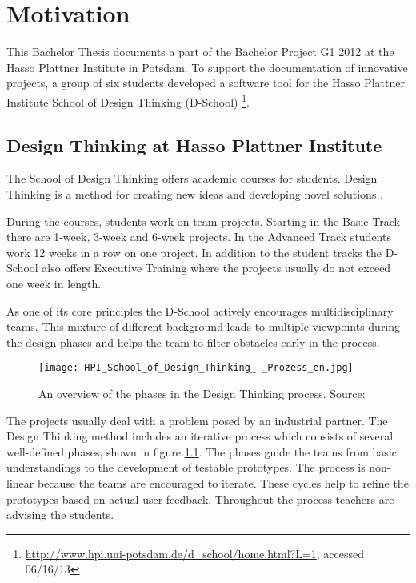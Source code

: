 \chapter{Motivation}

This Bachelor Thesis documents a part of the Bachelor Project G1 2012 at the Hasso Plattner Institute in Potsdam. To support the documentation of innovative projects, a group of six students developed a software tool for the Hasso Plattner Institute School of Design Thinking (D-School) \footnote{\url{http://www.hpi.uni-potsdam.de/d_school/home.html?L=1}, accessed 06/16/13}. 

\section{Design Thinking at Hasso Plattner Institute}
The School of Design Thinking offers academic courses for students. Design Thinking is a method for creating new ideas and developing novel solutions \cite{Plattner_2009}. 

During the courses, students work on team projects. Starting in the Basic Track there are 1-week, 3-week and 6-week projects. In the Advanced Track students work 12 weeks in a row on one project. In addition to the student tracks the D-School also offers Executive Training where the projects usually do not exceed one week in length. 

As one of its core principles the D-School actively encourages multidisciplinary teams. This mixture of different background leads to multiple viewpoints during the design phases and helps the team to filter obstacles early in the process. 

\begin{figure}[!h]
\texttt{[image: HPI\_School\_of\_Design\_Thinking\_-\_Prozess\_en.jpg]}
\caption{An overview of the phases in the Design Thinking process. Source: \cite{Plattner_2009}}
\label{fig:DT_phases}
\end{figure}

\pagebreak

The projects usually deal with a problem posed by an industrial partner. The Design Thinking me\-thod includes an iterative process which consists of several well-defined phases, shown in figure \ref{fig:DT_phases}. The phases guide the teams from basic understandings to the development of testable prototypes. The process is non-linear because the teams are encouraged to iterate. These cycles help to refine the prototypes based on actual user feedback. Throughout the process teachers are advising the students.

